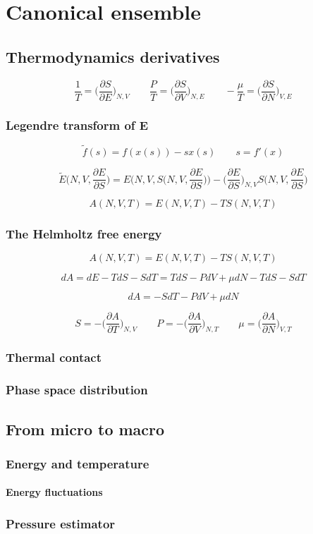 \chapter{Canonical ensemble}

\section{Thermodynamics derivatives}

$$\frac{1}{T} = \biggl(\frac{\partial S}{\partial E}\biggr)_{N, V}\qquad\frac{P}{T} = \biggl(\frac{\partial S}{\partial V}\biggr)_{N, E}\qquad -\frac{\mu}{T} = \biggl(\frac{\partial S}{\partial N}\biggr)_{V, E}$$

	\subsection{Legendre transform of E}

	$$\tilde{f}(s) = f(x(s))-sx(s)\qquad s = f'(x)$$

	$$\tilde{E}\biggl(N, V, \frac{\partial E}{\partial S}\biggr) = E\biggl(N, V, S\biggl(N, V, \frac{\partial E}{\partial S}\biggr)\biggr)-\biggl(\frac{\partial E}{\partial S}\biggr)_{N, V}S\biggl(N, V, \frac{\partial E}{\partial S}\biggr)$$

	$$A(N, V, T) = E(N, V, T)-TS(N, V, T)$$

	\subsection{The Helmholtz free energy}

	$$A(N, V, T) = E(N, V, T)-TS(N, V, T)$$

	$$dA = dE - TdS - SdT = TdS - PdV + \mu dN- TdS - SdT$$

	$$dA = -SdT - PdV +\mu dN$$

	$$S = -\biggl(\frac{\partial A}{\partial T}\biggr)_{N, V}\qquad P = -\biggl(\frac{\partial A}{\partial V}\biggr)_{N, T}\qquad \mu = \biggl(\frac{\partial A}{\partial N}\biggr)_{V, T}$$

	\subsection{Thermal contact}

	\subsection{Phase space distribution}

\section{From micro to macro}

	\subsection{Energy and temperature}

		\subsubsection{Energy fluctuations}

	\subsection{Pressure estimator}
